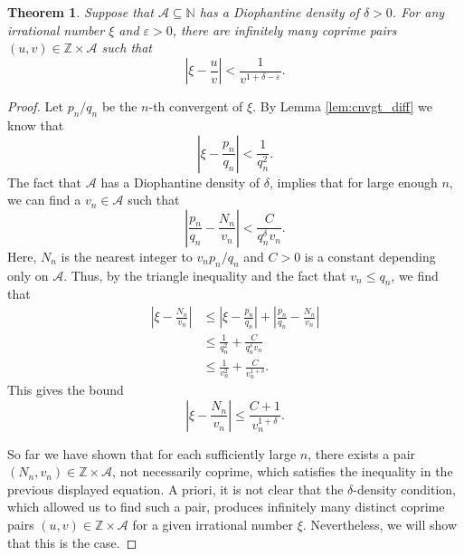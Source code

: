 \documentclass[reqno]{amsart}
\newtheorem{theorem}{Theorem}
\theoremstyle{definition}
\begin{document}
\begin{theorem}\label{thm:main}
    Suppose that $\mathcal{A} \subseteq \mathbb{N}$ has a Diophantine density of $\delta > 0$.  For any irrational number $\xi$ and $\varepsilon > 0$, there are infinitely many coprime pairs $(u,v) \in \mathbb{Z} \times \mathcal{A}$ such that
    \begin{equation*}
    \left\vert{\xi - \frac{u}{v}}\right\vert < \frac{1}{v^{1+\delta - \varepsilon}}.
    \end{equation*}
\end{theorem}
\begin{proof}
Let $p_{n}/q_{n}$ be the $n$-th convergent of $\xi$.  By Lemma \ref{lem:cnvgt_diff} we know that
\begin{equation*}
    \left\vert{ \xi - \frac{p_{n}}{q_{n}}}\right\vert < \frac{1}{q_{n}^{2}}.
\end{equation*}
The fact that $\mathcal{A}$ has a Diophantine density of $\delta$, implies that for large enough $n$, we can find a $v_{n} \in \mathcal{A}$ such that
\begin{equation*}
    \left\vert{\frac{p_{n}}{q_{n}} - \frac{N_{n}}{v_{n}}}\right\vert < \frac{C}{q_{n}^{\delta}v_{n}}.
\end{equation*}
Here, $N_{n}$ is the nearest integer to $v_{n} p_{n}/q_{n}$ and $C > 0$ is a constant depending only on $\mathcal{A}$. Thus, by the triangle inequality and the fact that $v_{n} \leq q_{n}$, we find that
    \begin{align*}
    \left\vert \xi - \frac{N_{n}}{v_{n}} \right\vert &\leq \left\vert{ \xi - \frac{p_{n}}{q_{n}}}\right\vert + \left\vert \frac{p_{n}}{q_{n}} -\frac{N_{n}}{v_{n}} \right\vert \\
    &\leq \frac{1}{q_{n}^{2}} + \frac{C}{q_{n}^{\delta} v_{n}} \\
    &\leq \frac{1}{v_{n}^{2}} + \frac{C}{v_{n}^{1+\delta}}.
\end{align*}
This gives the bound 
\begin{equation*}
    \left\vert \xi - \frac{N_{n}}{v_{n}} \right\vert \leq \frac{C+1}{v_{n}^{1+\delta}}.
\end{equation*}

So far we have shown that for each sufficiently large $n$, there exists a pair $(N_{n},v_{n}) \in \mathbb{Z} \times \mathcal{A}$, not necessarily coprime, which satisfies the inequality in the previous displayed equation.  A priori, it is not clear that the $\delta$-density condition, which allowed us to find such a pair, produces infinitely many distinct coprime pairs $(u,v) \in \mathbb{Z} \times \mathcal{A}$ for a given irrational number $\xi$.  Nevertheless, we will show that this is the case.


\end{proof}
\end{document}
